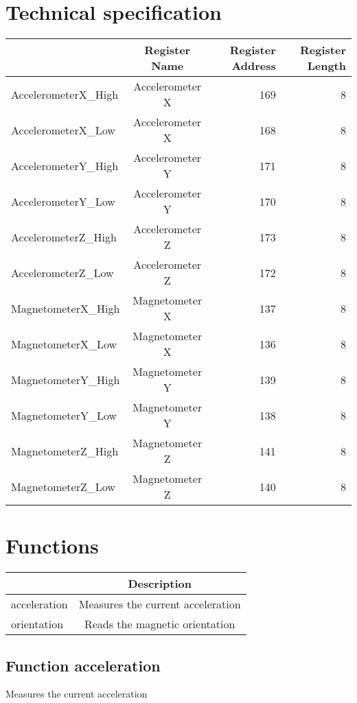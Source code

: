 \documentclass[a4paper,12pt,oneside,pdflatex,italian,final,twocolumn]{article}
\begin{document}
\section{Technical specification}
\centering
\begin{tabular}{lcrr}
\toprule
 & Register Name & Register Address & Register Length \\
\midrule
AccelerometerX\_High & Accelerometer X & 169 & 8 \\
AccelerometerX\_Low & Accelerometer X & 168 & 8 \\
AccelerometerY\_High & Accelerometer Y & 171 & 8 \\
AccelerometerY\_Low & Accelerometer Y & 170 & 8 \\
AccelerometerZ\_High & Accelerometer Z & 173 & 8 \\
AccelerometerZ\_Low & Accelerometer Z & 172 & 8 \\
MagnetometerX\_High & Magnetometer X & 137 & 8 \\
MagnetometerX\_Low & Magnetometer X & 136 & 8 \\
MagnetometerY\_High & Magnetometer Y & 139 & 8 \\
MagnetometerY\_Low & Magnetometer Y & 138 & 8 \\
MagnetometerZ\_High & Magnetometer Z & 141 & 8 \\
MagnetometerZ\_Low & Magnetometer Z & 140 & 8 \\
\bottomrule
\end{tabular}


\raggedright

\section{Functions}

\centering
\begin{tabular}{lc}
\toprule
  & Description \\
\midrule
acceleration & Measures the current acceleration \\
orientation & Reads the magnetic orientation \\
\bottomrule
\end{tabular}


\raggedright
\subsection{Function acceleration }
Measures the current acceleration \\
\end{document}
